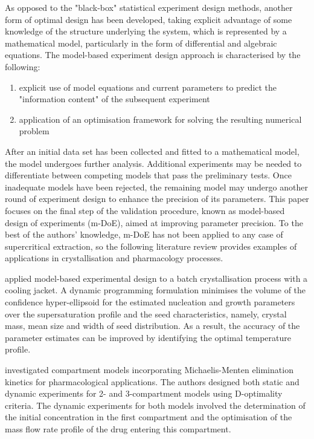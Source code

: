 \documentclass[a4paper,fleqn]{cas-dc}
\begin{document}
As opposed to the "black-box" statistical experiment design methods, another form of optimal design has been developed, taking explicit advantage of some knowledge of the structure underlying the system, which is represented by a mathematical model, particularly in the form of differential and algebraic equations. The model-based experiment design approach is characterised by the following:

\begin{enumerate}
	\item explicit use of model equations and current parameters to predict the "information content" of the subsequent experiment
	\item application of an optimisation framework for solving the resulting numerical problem
\end{enumerate}

After an initial data set has been collected and fitted to a mathematical model, the model undergoes further analysis. Additional experiments may be needed to differentiate between competing models that pass the preliminary tests. Once inadequate models have been rejected, the remaining model may undergo another round of experiment design to enhance the precision of its parameters. This paper focuses on the final step of the validation procedure, known as model-based design of experiments (m-DoE), aimed at improving parameter precision. To the best of the authors' knowledge, m-DoE has not been applied to any case of supercritical extraction, so the following literature review provides examples of applications in crystallisation and pharmacology processes.

\citet{Chung2000} applied model-based experimental design to a batch crystallisation process with a cooling jacket. A dynamic programming formulation minimises the volume of the confidence hyper-ellipsoid for the estimated nucleation and growth parameters over the supersaturation profile and the seed characteristics, namely, crystal mass, mean size and width of seed distribution. As a result, the accuracy of the parameter estimates can be improved by identifying the optimal temperature profile.

\citet{Duarte2019} investigated compartment models incorporating Michaelis-Menten elimination kinetics for pharmacological applications. The authors designed both static and dynamic experiments for 2- and 3-compartment models using D-optimality criteria. The dynamic experiments for both models involved the determination of the initial concentration in the first compartment and the optimisation of the mass flow rate profile of the drug entering this compartment.
\end{document}
